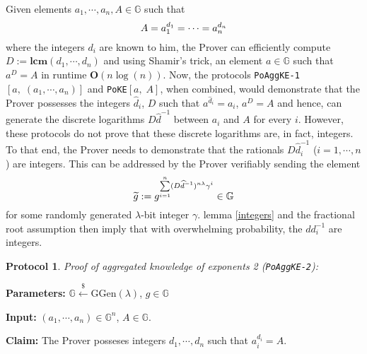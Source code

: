\documentclass[11pt, lettersize, notitlepage, leqno, footskip=0.6cm]{article}
\newcommand{\slim}{\sum\limits}
\newcommand{\bG}{\mathbb{G}}
\newcommand{\wti}{\widetilde}
\newcommand{\mb}{\mathbb}
\newcommand{\mbf}{\mathbf}
\newcommand{\mr}{\mathrm}
\newcommand{\lam}{\lambda}
\newcommand{\lamb}{\lambda}
\newcommand{\what}{\widehat}
\newcommand{\vs}{\vspace{-0.15cm}}
\newcommand{\noin}{\noindent}
\newcommand{\LCM}{\mbf{lcm}}
\newtheorem{Prot}[Thm]{Protocol}
\numberwithin{equation}{section}
\begin{document}
{Given elements $a_1,\cdots,a_n, A\in\bG$} such that \vs $$A = a_1^{d_1} =\cdots = a_n^{d_n} \vs $$ where the integers $d_i$ are known to him, the Prover can efficiently compute $D:= \LCM(d_1,\cdots,d_n)$ and  using Shamir's trick, an element $a\in\mb{G}$ such that $a^D = A$ in runtime $\mbf{O}(n\log(n))$. Now, the protocols \verb|PoAggKE-1|$[a,\;(a_1,\cdots,a_n)]$ and \verb|PoKE|$[a,\;A]$, when combined, would demonstrate that the Prover possesses the integers $\what{d}_i$, $D$ such that $a^{\what{d}_i} = a_i$, $a^D = A$ and hence, can generate the discrete logarithms $D\what{d}^{-1}$ between $a_i$ and $A$ for every $i$. However, these protocols do not prove that these discrete logarithms are, in fact, integers. To that end, the Prover needs to demonstrate that the rationals $D\what{d}_i^{-1}$ ($i=1,\cdots, n$) are integers. This can be addressed by the Prover verifiably sending the element \vspace{-0.2cm} $$\wti{g} := g^{\slim_{i=1}^{n} (D\what{d}^{-1})^{n\lam}\gamma^i}\in\bG \vs $$ for some randomly generated $\lam$-bit integer $\gamma$. lemma \ref{integers} and the fractional root assumption then imply that with overwhelming probability, the $dd_i^{-1}$ are integers.

 

\vspace{0.2cm}  

\begin{Prot}\normalfont \hypertarget{AggKE-2}{\textit{Proof of aggregated knowledge of exponents} 2 }(\verb|PoAggKE-2|): \end{Prot}\vspace{-0.3cm}

\noin \textbf{Parameters:} $\mb{G}\xleftarrow{\$} \mr{GGen}(\lamb)$,\; $g\in \mb{G}$ 

\noin \textbf{Input:} $(a_1,\cdots,a_n) \in \mb{G}^n$, $A\in\mb{G}$.

\noin \textbf{Claim:} The Prover posseses integers $d_1,\cdots,d_n$ such that $a_i^{d_i} = A$. \vs
\end{document}
